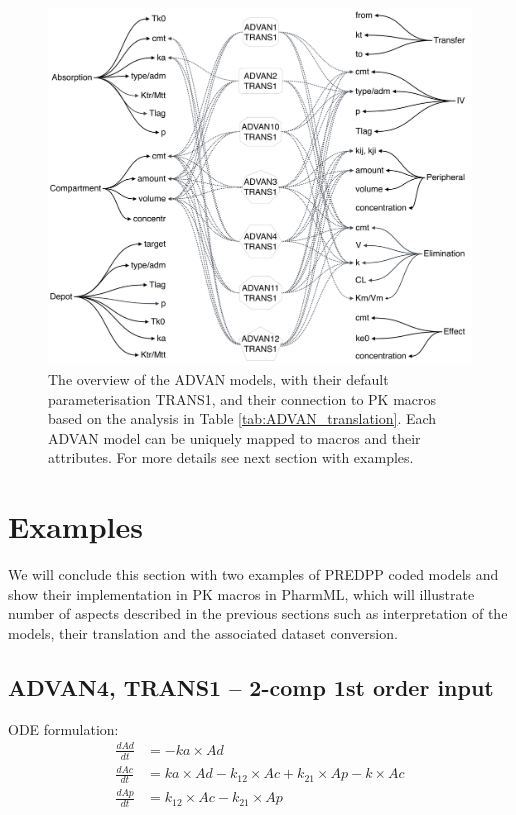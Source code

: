 \begin{figure}[htbp!]
\centering
 \includegraphics[width=170mm]{pics/AdvanMacrosMaster.pdf}
\caption{The overview of the ADVAN models, with their default parameterisation TRANS1, 
and their connection to PK macros based on the analysis in Table \ref{tab:ADVAN_translation}. 
Each ADVAN model can be uniquely mapped to macros and their attributes. For more 
details see next section with examples.}
\label{fig:AdvanMacrosMaster}
\end{figure}


\section{Examples}
\label{subsec:PREDPPinMACROSExamples}

We will conclude this section with two examples of PREDPP coded models 
and show their implementation in PK macros in PharmML, which will
illustrate number of aspects described in the previous sections such as 
interpretation of the models, their translation and the associated dataset 
conversion.

\subsection{ADVAN4, TRANS1 -- 2-comp 1st order input}
ODE formulation:
\begin{align}
\frac{dAd}{dt} &= -ka \times Ad \nonumber \\
\frac{dAc}{dt} &= ka \times Ad - k_{12} \times Ac + k_{21} \times Ap - k \times Ac  \nonumber \\
\frac{dAp}{dt} &= k_{12} \times Ac - k_{21} \times Ap  \nonumber
\end{align}

